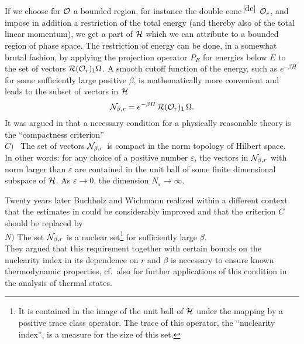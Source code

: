 If we choose for $\cal O$ a
bounded region, for instance the double cone$^{\, \ref{dc}}$ ${\cal O}_r$,  
and impose in addition a
restriction of the total energy (and thereby also of the total linear
momentum), we get a part of $\cal H$ which we can attribute 
to a bounded region of phase space. 
The restriction of energy can be done, in a somewhat brutal fashion, 
by applying the projection operator $P_E$ for energies below $E$ 
to the set of vectors ${\cal R}({\cal O}_r)_1 {\Omega}$. 
A smooth cutoff function of the energy, such as 
$e^{-\beta H}$ for some sufficiently large positive $\beta$, 
is mathematically more convenient and leads to the subset of 
vectors in $\cal H$
\begin{equation}
{\cal N}_{\beta,r} = e^{-\beta H}\, {\cal R} ({\cal O}_r)_1 \,  {\Omega} .
\end{equation}
It was argued in \cite{HaSw} that a necessary condition for a 
physically reasonable theory 
is the ``compactness criterion''\\[2mm]
$C)$ \ The set of vectors ${\cal N}_{\beta,r}$ is compact in the norm topology
of Hilbert space.\\[2mm]
In other words: for any choice of a positive number $\varepsilon$, the
vectors in ${\cal N}_{\beta,r}$ with norm larger than $\varepsilon$ are
contained in the unit ball of some finite dimensional subspace of
$\cal H$. As $\varepsilon \to 0$, the dimension $N_\varepsilon \to \infty$.

Twenty years later Buchholz and Wichmann \cite{BuWi} 
realized within a different context that the
estimates in \cite{HaSw} could be considerably improved and that the
criterion $C$ should be replaced by\\[2mm]
$N)$ The set ${\cal N}_{\beta,r}$ 
is a nuclear set\footnote{It is
contained in the image of the unit ball of ${\cal H}$ under the
mapping by a positive trace class operator. The trace of this
operator, the ``nuclearity index'', 
is a measure for the size of this set.} for sufficiently 
large $\beta$.\\[2mm]
They argued that this requirement together with
certain bounds on the nuclearity index in its dependence on $r$
and $\beta$ is necessary to ensure known thermodynamic
properties, cf.\ also \cite{BuJu,BrBu} for  
further applications of this condition in the analysis of 
thermal states. 

